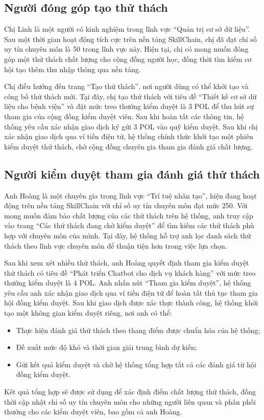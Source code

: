 \subsection{Người đóng góp tạo thử thách}

Chị Linh là một người có kinh nghiệm trong lĩnh vực ``Quản trị cơ sở dữ liệu''. Sau một thời gian hoạt động tích cực trên nền tảng SkillChain, chị đã đạt chỉ số uy tín chuyên môn là 50 trong lĩnh vực này.
Hiện tại, chị có mong muốn đóng góp một thử thách chất lượng cho cộng đồng người học, đồng thời tìm kiếm cơ hội tạo thêm thu nhập thông qua nền tảng.

Chị điều hướng đến trang ``Tạo thử thách'', nơi người dùng có thể khởi tạo và công bố thử thách mới. Tại đây, chị tạo thử thách với tiêu đề ``Thiết kế cơ sở dữ liệu cho bệnh viện'' và đặt mức treo thưởng kiểm duyệt là 3 POL để thu hút sự tham gia của cộng đồng kiểm duyệt viên.
Sau khi hoàn tất các thông tin, hệ thống yêu cầu xác nhận giao dịch ký gửi 3 POL vào quỹ kiểm duyệt. Sau khi chị xác nhận giao dịch qua ví tiền điện tử, hệ thống chính thức khởi tạo một phiên kiểm duyệt thử thách, chờ cộng đồng chuyên gia tham gia đánh giá chất lượng.

\subsection{Người kiểm duyệt tham gia đánh giá thử thách}

Anh Hoàng là một chuyên gia trong lĩnh vực ``Trí tuệ nhân tạo'', hiện đang hoạt động trên nền tảng SkillChain với chỉ số uy tín chuyên môn đạt mức 250.
Với mong muốn đảm bảo chất lượng của các thử thách trên hệ thống, anh truy cập vào trang ``Các thử thách đang chờ kiểm duyệt'' để tìm kiếm các thử thách phù hợp với chuyên môn của mình.
Tại đây, hệ thống hỗ trợ anh lọc danh sách thử thách theo lĩnh vực chuyên môn để thuận tiện hơn trong việc lựa chọn.

Sau khi xem xét nhiều thử thách, anh Hoàng quyết định tham gia kiểm duyệt thử thách có tiêu đề ``Phát triển Chatbot cho dịch vụ khách hàng'' với mức treo thưởng kiểm duyệt là 4 POL.
Anh nhấn nút ``Tham gia kiểm duyệt'', hệ thống yêu cầu anh xác nhận giao dịch qua ví tiền điện tử để hoàn tất thủ tục tham gia hội đồng kiểm duyệt. Sau khi giao dịch được xác thực thành công, hệ thống khởi tạo một không gian kiểm duyệt riêng, nơi anh có thể:

\begin{itemize}
  \item Thực hiện đánh giá thử thách theo thang điểm được chuẩn hóa của hệ thống;
  \item Đề xuất mức độ khó và thời gian giải trung bình dự kiến;
  \item Gửi kết quả kiểm duyệt và chờ hệ thống tổng hợp tất cả các đánh giá từ hội đồng kiểm duyệt.
\end{itemize}
Kết quả tổng hợp sẽ được sử dụng để xác định điểm chất lượng thử thách, đồng thời cập nhật chỉ số uy tín chuyên môn cho những người liên quan và phân phối thưởng cho các kiểm duyệt viên, bao gồm cả anh Hoàng.


